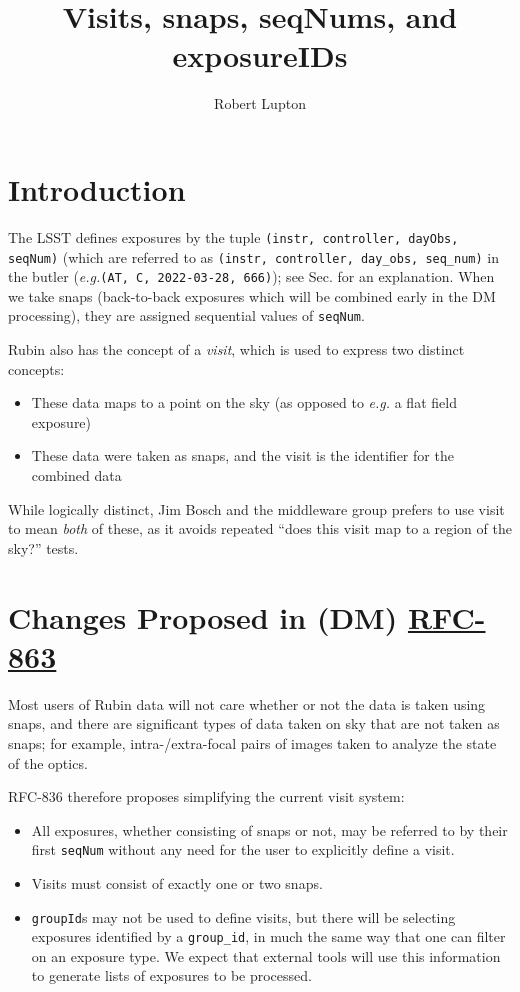 \documentclass[SE,authoryear,toc]{lsstdoc}
\title{Visits, snaps, seqNums, and exposureIDs}
\author{%
Robert Lupton
}
\date{\vcsDate}
\renewcommand{\eg}{\textit{e.g.}\xspace}
\begin{document}
\maketitle


\section{Introduction}

The LSST defines exposures by the tuple \texttt{(instr, controller, dayObs, seqNum)} (which are referred to
as \texttt{(instr, controller, day\_obs, seq\_num)} in the butler (\eg \texttt{(AT, C, 2022-03-28, 666)});
see Sec. \label{sec:imageIdentifiers} for an explanation.
When we take snaps (back-to-back exposures which will
be combined early in the DM processing), they are assigned sequential values of \texttt{seqNum}.

Rubin also has the concept of a \textit{visit}, which is used to express two distinct concepts:
\begin{itemize}
\item
  These data maps to a point on the sky (as opposed to \eg a flat field exposure)
\item
  These data were taken as snaps, and the visit is the identifier for the combined data
\end{itemize}
While logically distinct, Jim Bosch and the middleware group prefers to use visit to mean
\textit{both} of these,
as it avoids repeated ``does this visit map to a region of the sky?'' tests.

\section{Changes Proposed in (DM) \href{https://jira.lsstcorp.org/browse/RFC-836}{RFC-863}}

Most users of Rubin data will not care whether or not the data is taken using snaps, and
there are significant types of data taken on sky that are not taken as snaps; for example, intra-/extra-focal
pairs of images taken to analyze the state of the optics.

RFC-836 therefore proposes simplifying the current visit system:
\begin{itemize}
\item
  All exposures, whether consisting of snaps or not, may be referred to by their first
  \texttt{seqNum} without any need for the user to explicitly define a visit.
\item
  Visits must consist of exactly one or two snaps.
\item
  \texttt{groupId}s may not be used to define visits, but there will be selecting
  exposures identified by a \texttt{group\_id}, in much the same way that one can filter on an
  exposure type.  We expect that external tools will use this information to generate
  lists of exposures to be processed.
\end{itemize}
\end{document}
